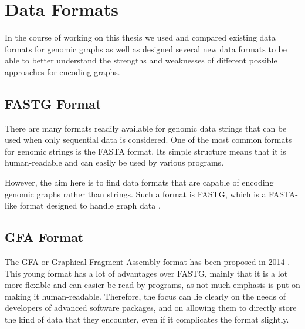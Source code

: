 \documentclass[a4paper,12pt,twoside,BCOR=10mm]{scrbook}
\begin{document}
\section{Data Formats}
%

In the course of working on this thesis we used and compared existing data 
formats for genomic graphs as well as designed several new data formats 
to be able to better understand the strengths and weaknesses of 
different possible approaches for encoding graphs.

\subsection{FASTG Format}

There are many formats readily available for genomic data strings 
that can be used when only sequential data is considered. 
One of the most common formats for genomic strings is the FASTA format. 
Its simple structure means that it is human-readable 
and can easily be used by various programs.

However, the aim here is to find data formats that are capable of 
encoding genomic graphs rather than strings. 
Such a format is FASTG, which is 
a FASTA-like format designed to handle graph data \citep{specFASTG}. 


\subsection{GFA Format}

The GFA or Graphical Fragment Assembly format 
has been proposed in 2014 \citep{specGFA1,specGFA2}. 
This young format has a lot of advantages over FASTG, mainly 
that it is a lot more flexible and can easier be read by programs, 
as not much emphasis is put on making it human-readable. 
Therefore, the focus can lie clearly on the needs of developers of advanced software packages, 
and on allowing them to directly store the kind of data that they encounter, 
even if it complicates the format slightly.
\end{document}

